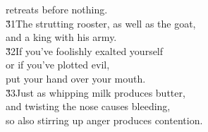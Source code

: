\begin{poetry}
\poemll    retreats before nothing. \\
\poeml \v{31}The strutting rooster, as well as the goat, \\
\poemll    and a king with his army. \\
\poeml \v{32}If you've foolishly exalted yourself \\
\poemll    or if you've plotted evil, \\
\poemlll       put your hand over your mouth. \\
\poeml \v{33}Just as whipping milk produces butter, \\
\poemll    and twisting the nose causes bleeding, \\
\poemlll       so also stirring up anger produces contention.
\end{poetry}

